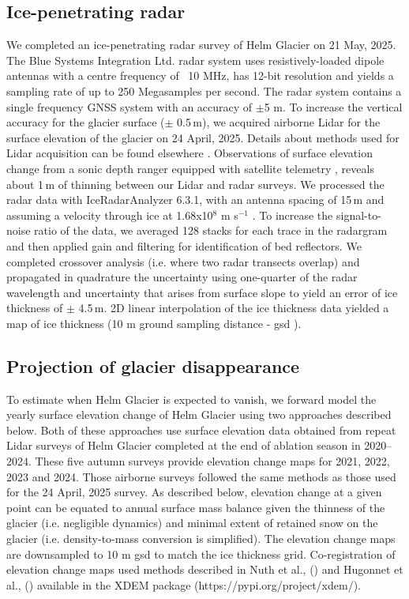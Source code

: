 \documentclass[annals,twocolumn,letterpaper]{igs}
\begin{document}
\subsection{Ice-penetrating radar}

We completed an ice-penetrating radar survey of Helm Glacier on 21 May, 2025. The Blue Systems Integration Ltd. radar system uses resistively-loaded dipole antennas with a centre frequency of ~10 MHz, has 12-bit resolution and yields a sampling rate of up to 250 Megasamples per second. The radar system contains a single frequency GNSS system with an accuracy of $\pm$5 m. To increase the vertical accuracy for the glacier surface ($\pm$ 0.5\,m), we acquired airborne Lidar for the surface elevation of the glacier on 24 April, 2025. Details about methods used for Lidar acquisition can be found elsewhere \citep{Menounos2025}.  Observations of surface elevation change from a sonic depth ranger equipped with satellite telemetry \cite{Bevington2025a}, reveals about 1\,m of thinning between our Lidar and radar surveys. We processed the radar data with IceRadarAnalyzer 6.3.1, with an antenna spacing of 15\,m and assuming a velocity through ice at 1.68x10$^{8}$ m s$^{-1}$ \citep{Reynolds2011}. To increase the signal-to-noise ratio of the data, we averaged 128 stacks for each trace in the radargram and then applied gain and filtering for identification of bed reflectors. We completed crossover analysis (i.e. where two radar transects overlap) and propagated in quadrature  the uncertainty using one-quarter of the radar wavelength \cite{Reynolds2011} and uncertainty that arises from surface slope to yield an error of ice thickness of $\pm$ 4.5\,m.  2D linear interpolation of the ice thickness data yielded a map of ice thickness (10 m ground sampling distance - gsd ). 

\subsection{Projection of glacier disappearance}

To estimate when Helm Glacier is expected to vanish, we forward model the yearly surface elevation change of Helm Glacier using two approaches described below. Both of these approaches use surface elevation data obtained from repeat Lidar surveys of Helm Glacier completed at the end of ablation season in 2020--2024. These five autumn surveys provide elevation change maps for 2021, 2022, 2023 and 2024.  Those airborne surveys followed the same methods as those used for the 24 April, 2025 survey. As described below, elevation change at a given point can be equated to annual surface mass balance given the thinness of the glacier (i.e. negligible dynamics) and minimal extent of retained snow on the glacier (i.e. density-to-mass conversion is simplified). The elevation change maps are downsampled to 10 m gsd to match the ice thickness grid. Co-registration of elevation change maps used methods described in Nuth et al.,  (\citeyear{Nuth2011}) and Hugonnet et al., (\citeyear{Hugonnet_2022}) available in the XDEM package (https://pypi.org/project/xdem/).
\end{document}
